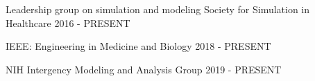 
\begin{cventries}

  \cventry
    {Leadership group on simulation and modeling} %
    {Society for Simulation in Healthcare} %
    {} %
    {2016 - PRESENT} %
    {
    }

      \cventry
    {} %
    {IEEE: Engineering in Medicine and Biology} %
    {} %
    {2018 - PRESENT} %
    {
    }

      \cventry
    {} %
    {NIH Intergency Modeling and Analysis Group } %
    {} %
    {2019 - PRESENT} %
    {
    }



\end{cventries}
